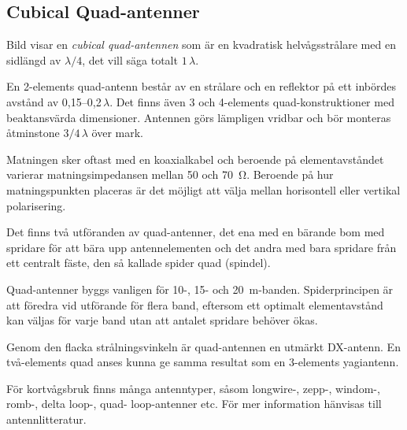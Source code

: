\subsection{Cubical Quad-antenner}


Bild  visar en \emph{cubical quad-antennen} som är en
kvadratisk helvågsstrålare med en sidlängd av \(\lambda/4\), det vill säga
totalt \(1\,\lambda\).

En 2-elements quad-antenn består av en strålare och en reflektor på ett inbördes
avstånd av 0,15--0,2\,\(\lambda\).
Det finns även 3 och 4-elements quad-konstruktioner med beaktansvärda
dimensioner.
Antennen görs lämpligen vridbar och bör monteras åtminstone $3/4\,\lambda$
över mark.

Matningen sker oftast med en koaxialkabel och beroende på elementavståndet
varierar matningsimpedansen mellan 50 och \qty{70}{\ohm}.
Beroende på hur matningspunkten placeras är det möjligt att välja mellan
horisontell eller vertikal polarisering.

Det finns två utföranden av quad-antenner, det ena med en bärande bom
med spridare för att bära upp antennelementen och det andra med bara
spridare från ett centralt fäste, den så kallade spider quad (spindel).

Quad-antenner byggs vanligen för 10-, 15- och \qty{20}{\metre}-banden.
Spiderprincipen är att föredra vid utförande för flera band, eftersom ett
optimalt element\-avstånd kan väljas för varje band utan att antalet spridare
behöver ökas.

Genom den flacka strålningsvinkeln är quad-\-an\-tennen en utmärkt DX-antenn.
En två-elements quad anses kunna ge samma resultat som en 3-elements yagiantenn.

För kortvågsbruk finns många antenntyper, såsom longwire-, zepp-,
windom-, romb-, delta loop-, quad- loop-antenner etc.
För mer information hänvisas till antennlitteratur.
